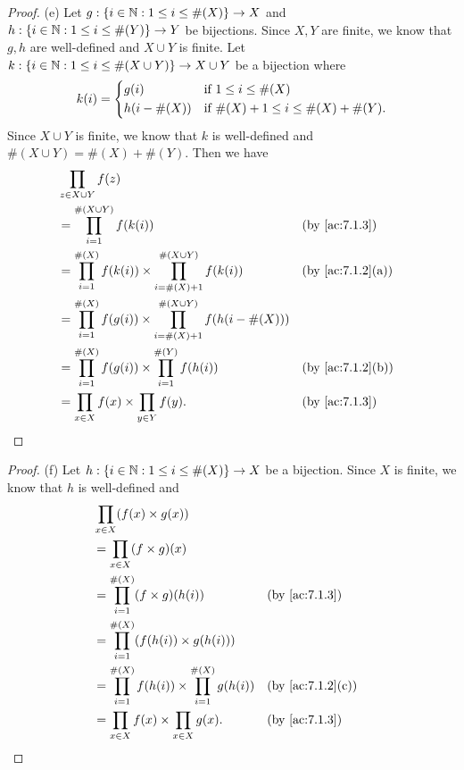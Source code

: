 \begin{proof}{(e)}
  Let \(g : \{i \in \mathbb{N} : 1 \leq i \leq \#(X)\} \to X\) and \(h : \{i \in \mathbb{N} : 1 \leq i \leq \#(Y)\} \to Y\) be bijections.
  Since \(X, Y\) are finite, we know that \(g, h\) are well-defined and \(X \cup Y\) is finite.
  Let \(k : \{i \in \mathbb{N} : 1 \leq i \leq \#(X \cup Y)\} \to X \cup Y\) be a bijection where
  \[
    k(i) = \begin{dcases}
      g(i)         & \text{if } 1 \leq i \leq \#(X)                  \\
      h(i - \#(X)) & \text{if } \#(X) + 1 \leq i \leq \#(X) + \#(Y).
    \end{dcases}
  \]
  Since \(X \cup Y\) is finite, we know that \(k\) is well-defined and \(\#(X \cup Y) = \#(X) + \#(Y)\).
  Then we have
  \begin{align*}
     & \prod_{z \in X \cup Y} f(z)                                                                                                     \\
     & = \prod_{i = 1}^{\#(X \cup Y)} f(k(i))                                                      &  & \text{(by \cref{ac:7.1.3})}    \\
     & = \prod_{i = 1}^{\#(X)} f(k(i)) \times \prod_{i = \#(X) + 1}^{\#(X \cup Y)} f(k(i))         &  & \text{(by \cref{ac:7.1.2}(a))} \\
     & = \prod_{i = 1}^{\#(X)} f(g(i)) \times \prod_{i = \#(X) + 1}^{\#(X \cup Y)} f(h(i - \#(X)))                                     \\
     & = \prod_{i = 1}^{\#(X)} f(g(i)) \times \prod_{i = 1}^{\#(Y)} f(h(i))                        &  & \text{(by \cref{ac:7.1.2}(b))} \\
     & = \prod_{x \in X} f(x) \times \prod_{y \in Y} f(y).                                         &  & \text{(by \cref{ac:7.1.3})}
  \end{align*}
\end{proof}

\begin{proof}{(f)}
  Let \(h : \{i \in \mathbb{N} : 1 \leq i \leq \#(X)\} \to X\) be a bijection.
  Since \(X\) is finite, we know that \(h\) is well-defined and
  \begin{align*}
     & \prod_{x \in X} (f(x) \times g(x))                                                                       \\
     & = \prod_{x \in X} (f \times g)(x)                                                                        \\
     & = \prod_{i = 1}^{\#(X)} (f \times g)(h(i))                           &  & \text{(by \cref{ac:7.1.3})}    \\
     & = \prod_{i = 1}^{\#(X)} (f(h(i)) \times g(h(i)))                                                         \\
     & = \prod_{i = 1}^{\#(X)} f(h(i)) \times \prod_{i = 1}^{\#(X)} g(h(i)) &  & \text{(by \cref{ac:7.1.2}(c))} \\
     & = \prod_{x \in X} f(x) \times \prod_{x \in X} g(x).                  &  & \text{(by \cref{ac:7.1.3})}
  \end{align*}
\end{proof}


